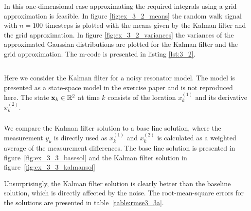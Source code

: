 \documentclass[a4paper,oneside,article]{memoir}
\begin{document}
In this one-dimensional case approximating the required
integrals using a grid approximation is feasible. In figure \ref{fig:ex_3_2_means}
the random walk signal with $n=100$ timesteps is plotted with the means given
by the Kalman filter and the grid approximation. In figure \ref{fig:ex_3_2_variances}
the variances of the approximated Gaussian distributions are plotted for 
the Kalman filter and the grid approximation. The m-code is presented in listing \ref{lst:3_2}. 

\clearpage


\subsection{}\label{sec:3_3}
Here we consider the Kalman filter for a noisy resonator model. The model
is presented as a state-space model in the exercise paper and is not
reproduced here. The state $\mathbf{x}_k\in\mathbb{R}^2$ at time $k$ consists
of the location $x_k^{(1)}$ and its derivative $x_k^{(2)}$. 

\subsubsection{}\label{sec:3_3a}
We compare the Kalman filter solution to a base line solution, where the
measurement $y_k$ is directly used as $x_k^{(1)}$ and $x_k^{(2)}$ is calculated
as a weighted average of the measurement differences. The base line solution is
presented in figure~\ref{fig:ex_3_3_basesol} and the Kalman filter solution in 
figure~\ref{fig:ex_3_3_kalmansol}


Unsurprisingly, the Kalman filter solution is clearly better than the baseline
solution, which is directly affected by the noise. The root-mean-square errors
for the solutions are presented in table~\ref{table:rmse3_3a}.


\subsubsection{\label{sec:3_3b}}
\end{document}
